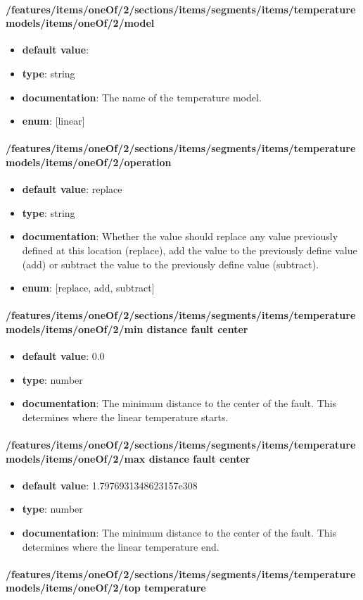 \paragraph{/features/items/oneOf/2/sections/items/segments/items/temperature models/items/oneOf/2/model}
\begin{itemize}\item {\bf default value}: 
\item {\bf type}: string
\item {\bf documentation}: The name of the temperature model.
\item {\bf enum}: [linear]\end{itemize}\paragraph{/features/items/oneOf/2/sections/items/segments/items/temperature models/items/oneOf/2/operation}
\begin{itemize}\item {\bf default value}: replace
\item {\bf type}: string
\item {\bf documentation}: Whether the value should replace any value previously defined at this location (replace), add the value to the previously define value (add) or subtract the value to the previously define value (subtract).
\item {\bf enum}: [replace, add, subtract]\end{itemize}\paragraph{/features/items/oneOf/2/sections/items/segments/items/temperature models/items/oneOf/2/min distance fault center}
\begin{itemize}\item {\bf default value}: 0.0
\item {\bf type}: number
\item {\bf documentation}: The minimum distance to the center of the fault. This determines where the linear temperature starts.
\end{itemize}\paragraph{/features/items/oneOf/2/sections/items/segments/items/temperature models/items/oneOf/2/max distance fault center}
\begin{itemize}\item {\bf default value}: 1.7976931348623157e308
\item {\bf type}: number
\item {\bf documentation}: The minimum distance to the center of the fault. This determines where the linear temperature end.
\end{itemize}\paragraph{/features/items/oneOf/2/sections/items/segments/items/temperature models/items/oneOf/2/top temperature}
